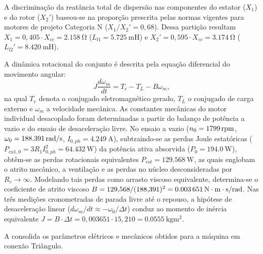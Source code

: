 A discriminação da reatância total de dispersão nas componentes do estator ($X_1$) e do rotor ($X_2'$) baseou-se na proporção prescrita pelas normas vigentes para motores de projeto Categoria N ($X_1 / X_2' = 0{,}68$). Dessa partição resultam $X_1 = 0{,}405 \cdot X_{cc} = \SI{2,158}{\ohm}$ ($L_{l1} = \SI{5,725}{\milli\henry}$) e $X_2' = 0{,}595 \cdot X_{cc} = \SI{3,174}{\ohm}$ ($L_{l2}' = \SI{8,420}{\milli\henry}$).

A dinâmica rotacional do conjunto é descrita pela equação diferencial do movimento angular:
\begin{equation}
J \frac{d\omega_m}{dt} = T_e - T_L - B \omega_m,
\label{eq:dinamica_rotacional_bancada}
\end{equation}
na qual $T_e$ denota o conjugado eletromagnético gerado, $T_L$ o conjugado de carga externo e $\omega_m$ a velocidade mecânica. As constantes mecânicas do motor individual desacoplado foram determinadas a partir do balanço de potência a vazio e do ensaio de desaceleração livre. No ensaio a vazio ($n_0 = \SI{1799}{\mathrm{rpm}}$, $\omega_0 = \SI{188,391}{\mathrm{rad/s}}$, $I_{0,ph} = \SI{4,249}{\ampere}$), subtraindo-se as perdas Joule estatóricas ($P_{cu1,0} = 3 R_1 I_{0,ph}^2 = \SI{64,432}{\watt}$) da potência ativa absorvida ($P_0 = \SI{194,0}{\watt}$), obtêm-se as perdas rotacionais equivalentes $P_{rot} = \SI{129,568}{\watt}$, as quais englobam o atrito mecânico, a ventilação e as perdas no núcleo desconsideradas por $R_c \to \infty$. Modelando tais perdas como arrasto viscoso equivalente, determina-se o coeficiente de atrito viscoso $B = 129{,}568 / (188{,}391)^2 = \SI{0,003651}{\mathrm{N\cdot m}\cdot\second/\radian}$. Nas três medições cronometradas de parada livre até o repouso, a hipótese de desaceleração linear ($d\omega_m / dt \approx -\omega_0 / \Delta t$) conduz ao momento de inércia equivalente $J = B \cdot \Delta t = 0{,}003651 \cdot 15{,}210 = \SI{0,0555}{\kilogram\meter\squared}$.

A  consolida os parâmetros elétricos e mecânicos obtidos para a máquina em conexão Triângulo.

